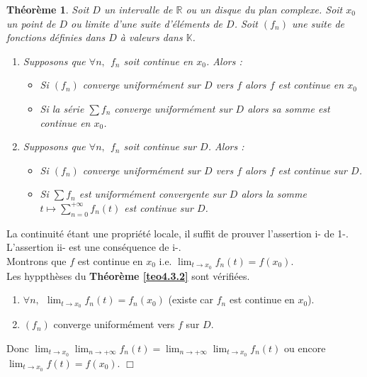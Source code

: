 \documentclass[11pt, a4paper]{book}
\newtheorem{teo}{Th\'eor\`eme}[section]
\newenvironment{pr}{\noindent {\bf Preuve} \noindent} {\hfill $\Box$\vskip 5mm}
\begin{document}
\begin{teo}  \label{teo4.4.2} Soit $D$ un intervalle de $\mathbb{R}$ ou un disque du plan complexe. Soit $x_0$ un point de $D$ ou limite d'une suite d'\'el\'ements de $D$. Soit $(f_n)$ une suite de fonctions d\'efinies dans $D$ \`a valeurs dans $\mathbb{K}$.
\begin{enumerate}
\item Supposons que $\forall n,~~f_n$ soit continue en $x_0$. Alors :
\begin{itemize}
\item[i-] Si $(f_n)$ converge uniform\'ement sur $D$ vers $f$ alors $f$ est continue en $x_0$
\item[ii-] Si la s\'erie $\sum f_n$ converge uniform\'ement sur $D$ alors sa somme est continue en $x_0$.
\end{itemize}
\item Supposons que $\forall n,~~f_n$ soit continue sur $D$. Alors :
\begin{itemize}
\item[i-] Si $(f_n)$ converge uniform\'ement sur $D$ vers $f$ alors $f$ est continue sur $D$.
\item[ii-] Si $\sum f_n$ est uniform\'ement convergente sur $D$ alors la somme ${\displaystyle  t\longmapsto \sum_{n=0}^{+\infty}f_n(t)}$ est continue sur $D$.
\end{itemize}
\end{enumerate}
\end{teo}
\begin{pr}\quad

La continuit\'e \'etant une propri\'et\'e locale, il suffit de prouver l'assertion i- de 1-. L'assertion ii- est une cons\'equence de i-.\\
Montrons que $f$ est continue en $x_0$ i.e. ${\displaystyle \lim_{t \rightarrow x_0}f_n(t)=f(x_0)}$. \\ Les hyppth\`eses du \textbf{Th\'eor\`eme \ref{teo4.3.2}} sont v\'erifi\'ees.
\begin{enumerate}
\item $\forall n,~~{\displaystyle \lim_{t\rightarrow x_0}f_n(t)=f_n(x_0)}$ (existe car $f_n$ est continue en $x_0$).
\item $(f_n)$ converge uniform\'ement vers $f$ sur $D$.
\end{enumerate}
Donc ${\displaystyle \lim_{t\rightarrow x_0}\lim_{n\rightarrow +\infty} f_n(t)=\lim_{n\rightarrow+\infty}\lim_{t\rightarrow x_0}f_n(t)}$ ou encore ${\displaystyle \lim_{t\rightarrow x_0}f(t)=f(x_0).}$ 
\end{pr}
\end{document}
